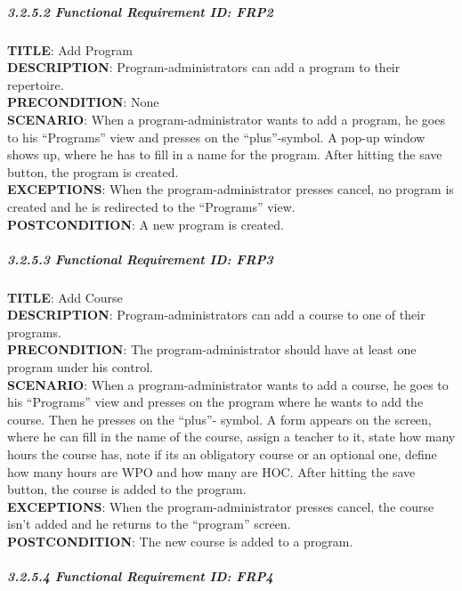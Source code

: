 \documentclass[12pt]{article}
\begin{document}
\subparagraph{3.2.5.2 Functional Requirement \textbf{ID}:
FRP2\\}\label{functional-requirement-id-frp2}

\textbf{TITLE}: Add Program\\\textbf{DESCRIPTION}:
Program-administrators can add a program to their
repertoire.\\\textbf{PRECONDITION}: None\\\textbf{SCENARIO}: When a
program-administrator wants to add a program, he goes to his
``Programs'' view and presses on the ``plus''-symbol. A pop-up window
shows up, where he has to fill in a name for the program. After hitting
the save button, the program is created.\\\textbf{EXCEPTIONS}: When the
program-administrator presses cancel, no program is created and he is
redirected to the ``Programs'' view.\\\textbf{POSTCONDITION}: A new
program is created.

\subparagraph{3.2.5.3 Functional Requirement \textbf{ID}:
FRP3\\}\label{functional-requirement-id-frp3}

\textbf{TITLE}: Add Course\\\textbf{DESCRIPTION}: Program-administrators
can add a course to one of their programs.\\\textbf{PRECONDITION}: The
program-administrator should have at least one program under his
control.\\\textbf{SCENARIO}: When a program-administrator wants to add a
course, he goes to his ``Programs'' view and presses on the program
where he wants to add the course. Then he presses on the ``plus''-
symbol. A form appears on the screen, where he can fill in the name of
the course, assign a teacher to it, state how many hours the course has,
note if its an obligatory course or an optional one, define how many
hours are WPO and how many are HOC. After hitting the save button, the
course is added to the program.\\\textbf{EXCEPTIONS}: When the
program-administrator presses cancel, the course isn't added and he
returns to the ``program'' screen.\\\textbf{POSTCONDITION}: The new
course is added to a program.

\subparagraph{3.2.5.4 Functional Requirement \textbf{ID}:
FRP4\\}\label{functional-requirement-id-frp4}
\end{document}
